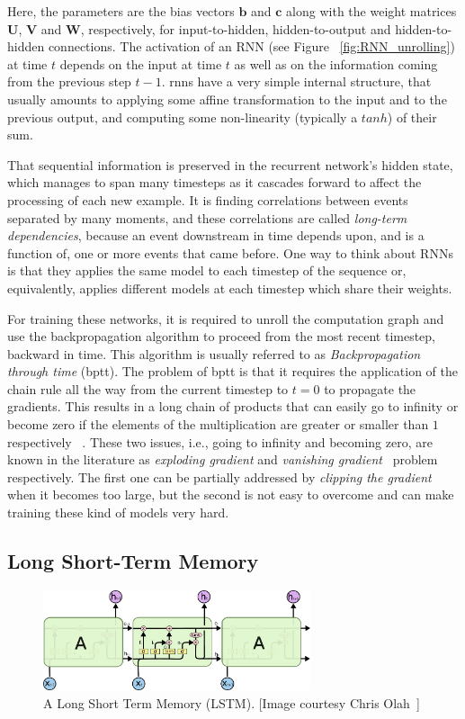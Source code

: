Here, the parameters are the bias vectors $ \textbf{b} $ and $ \textbf{c} $ along with the weight matrices $\textbf{U}$, $\textbf{V}$ and $\textbf{W}$, respectively, for input-to-hidden, hidden-to-output and hidden-to-hidden connections. The activation of an RNN (see Figure ~\ref{fig:RNN_unrolling}) at time $t$ depends on the input at time $t$ as well as on the information coming from the previous step $t-1$. \gls{rnn}s have a very simple internal structure, that usually amounts to applying some affine transformation to the input and to the previous output, and computing some non-linearity (typically a $tanh$) of their sum.

That sequential information is preserved in the recurrent network's hidden state, which manages to span many timesteps as it cascades forward to affect the processing of each new example. It is finding correlations between events separated by many moments, and these correlations are called \textit{long-term dependencies}, because an event downstream in time depends upon, and is a function of, one or more events that came before. One way to think about RNNs is that they applies the same model to each timestep of the sequence or, equivalently, applies different models at each timestep which share their weights. 

For training these networks, it is required to unroll the computation graph and use the backpropagation algorithm to proceed from the most recent timestep, backward in time. This algorithm is usually referred to as \emph{Backpropagation through time} (\gls{bptt}). The problem of \gls{bptt} is that it requires the application of the chain rule all the way from the current timestep to $t = 0$ to propagate the gradients.  This results in a long chain of products that can easily go to infinity or become zero if the elements of the multiplication are greater or smaller than $1$ respectively ~\cite{Bengio_94}. These two issues, i.e., going to infinity and becoming zero, are known in the literature as \emph{exploding gradient} and \emph{vanishing gradient}~\cite{Hochreiter_01} problem respectively. The first one can be partially addressed by \emph{clipping the gradient} when it becomes too large, but the second is not easy to overcome and can make training these kind of models very hard.


\subsection{Long Short-Term Memory}
\begin{figure}[t]
	\centering
	\includegraphics[width=0.7\textwidth]{figures/LSTM.pdf}
	\caption[A Long Short Term Memory (LSTM)]
	{A Long Short Term Memory (LSTM). [Image courtesy Chris Olah~\cite{colah_15}]\label{fig:LSTM}}
\end{figure}


